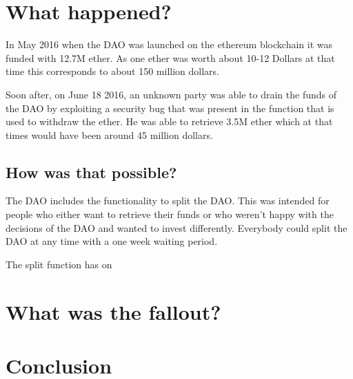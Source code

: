 \documentclass[a4paper, 11pt]{scrartcl}
\begin{document}
\section{What happened?}

In May 2016 when the DAO was launched on the ethereum blockchain it was funded with 12.7M ether. As one ether was worth about 10-12 Dollars at that time this corresponds to about 150 million dollars. 

Soon after, on June 18 2016, an unknown party was able to drain the funds of the DAO by exploiting a security bug that was present in the function that is used to withdraw the ether. He was able to retrieve 3.5M ether which at that times would have been around 45 million dollars. 

\subsection{How was that possible?}

The DAO includes the functionality to split the DAO. This was intended for people who either want to retrieve their funds or who weren't happy with the decisions of the DAO and wanted to invest differently. Everybody could split the DAO at any time with a one week waiting period.

The split function has on

\section{What was the fallout?}

\section{Conclusion}

\nocite{*}
\clearpage
\printbibliography[heading=bibintoc]
\end{document}
